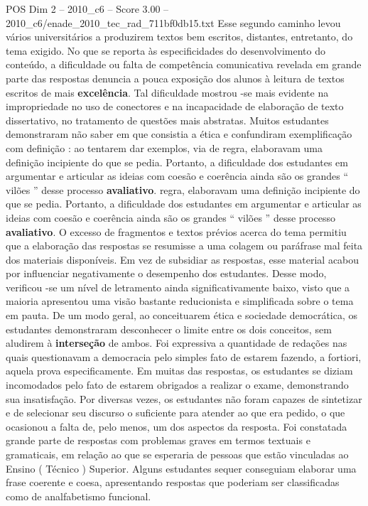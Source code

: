 \begin{textsample}{POS Dim 2 – 2010\_c6 – Score 3.00 – 2010\_c6/enade\_2010\_tec\_rad\_711bf0db15.txt}
Esse segundo caminho levou vários universitários a produzirem textos bem escritos, distantes, entretanto, do tema exigido.
No que se reporta às especificidades do desenvolvimento do conteúdo, a dificuldade ou falta de competência comunicativa revelada em grande parte das respostas denuncia a pouca exposição dos alunos à leitura de textos escritos de mais \textbf{excelência}.
Tal dificuldade mostrou -se mais evidente na impropriedade no uso de conectores e na incapacidade de elaboração de texto dissertativo, no tratamento de questões mais abstratas.
Muitos estudantes demonstraram não saber em que consistia a ética e confundiram exemplificação com definição : ao tentarem dar exemplos, via de regra, elaboravam uma definição incipiente do que se pedia.
Portanto, a dificuldade dos estudantes em argumentar e articular as ideias com coesão e coerência ainda são os grandes “ vilões ” desse processo \textbf{avaliativo}. regra, elaboravam uma definição incipiente do que se pedia.
Portanto, a dificuldade dos estudantes em argumentar e articular as ideias com coesão e coerência ainda são os grandes “ vilões ” desse processo \textbf{avaliativo}.
O excesso de fragmentos e textos prévios acerca do tema permitiu que a elaboração das respostas se resumisse a uma colagem ou paráfrase mal feita dos materiais disponíveis.
Em vez de subsidiar as respostas, esse material acabou por influenciar negativamente o desempenho dos estudantes.
Desse modo, verificou -se um nível de letramento ainda significativamente baixo, visto que a maioria apresentou uma visão bastante reducionista e simplificada sobre o tema em pauta.
De um modo geral, ao conceituarem ética e sociedade democrática, os estudantes demonstraram desconhecer o limite entre os dois conceitos, sem aludirem à \textbf{interseção} de ambos.
Foi expressiva a quantidade de redações nas quais questionavam a democracia pelo simples fato de estarem fazendo, a fortiori, aquela prova especificamente.
Em muitas das respostas, os estudantes se diziam incomodados pelo fato de estarem obrigados a realizar o exame, demonstrando sua insatisfação.
Por diversas vezes, os estudantes não foram capazes de sintetizar e de selecionar seu discurso o suficiente para atender ao que era pedido, o que ocasionou a falta de, pelo menos, um dos aspectos da resposta.
Foi constatada grande parte de respostas com problemas graves em termos textuais e gramaticais, em relação ao que se esperaria de pessoas que estão vinculadas ao Ensino ( Técnico ) Superior.
Alguns estudantes sequer conseguiam elaborar uma frase coerente e coesa, apresentando respostas que poderiam ser classificadas como de analfabetismo funcional.

\end{textsample}
